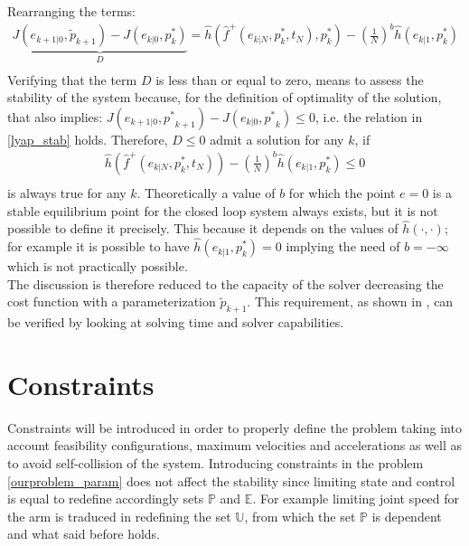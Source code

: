 Rearranging the terms:
\begin{equation}
\begin{split}
	\underbrace{J({e}_{k+1|0},\tilde{p}_{k+1})-J({e}_{k|0},p^*_k)}_{D}= \hat{h}(\hat{f}^+(e_{k|N},p^*_k,t_N),p^*_k) -\left( \frac{1}{N} \right)^b\hat{h}(e_{k|1},p^*_{k}) \\
\end{split}
\end{equation}
Verifying that the term $D$ is less than or equal to zero, means to assess the stability of the system because, for the definition of optimality of the solution, that also implies: $J({e}_{k+1|0},{p^*}_{k+1}) - J({e}_{k|0},{p^*}_k) \leq 0$, i.e. the relation in \ref{lyap_stab} holds. Therefore, $D\leq0$ admit a solution for any $k$, if 
\begin{equation}
\begin{split}
	\hat{h}(\hat{f}^+(e_{k|N},p^*_k,t_N))-\left( \frac{1}{N} \right)^b\hat{h}(e_{k|1},p^*_{k}) \leq 0 \\
\end{split}
\end{equation}
is always true for any $k$. Theoretically a value of $b$ for which the point $e=0$ is a stable equilibrium point for the closed loop system always exists, but it is not possible to define it precisely. This because it depends on the values of $\hat{h}(\cdot,\cdot)$; for example it is possible to have $\hat{h}(e_{k|1},p^*_{k})=0$ implying the need of $b=-\infty$ which is not practically possible.\\ The discussion is therefore reduced to the capacity of the solver decreasing the cost function with a parameterization $\tilde{p}_{k+1}$. This requirement, as shown in \cite{alamir_boh}, can be verified by looking at solving time and solver capabilities.


\section{Constraints}
Constraints will be introduced in order to properly define the problem taking into account feasibility configurations, maximum velocities and accelerations as well as to avoid self-collision of the system. Introducing constraints in the problem \ref{ourproblem_param} does not affect the stability since limiting state and control is equal to redefine accordingly sets $\mathbb{P}$ and $\mathbb{E}$. For example limiting joint speed for the arm is traduced in redefining the set $\mathbb{U}$, from which the set $\mathbb{P}$ is dependent and what said before holds.

